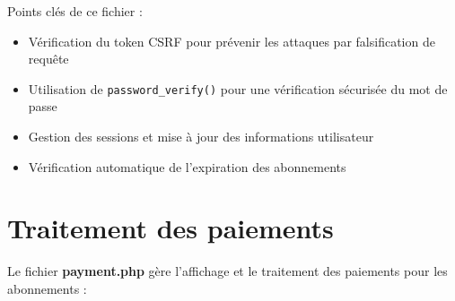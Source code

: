\documentclass[12pt,a4paper]{report}
\begin{document}
Points clés de ce fichier :
\begin{itemize}
    \item Vérification du token CSRF pour prévenir les attaques par falsification de requête
    \item Utilisation de \texttt{password\_verify()} pour une vérification sécurisée du mot de passe
    \item Gestion des sessions et mise à jour des informations utilisateur
    \item Vérification automatique de l'expiration des abonnements
\end{itemize}

\section{Traitement des paiements}
Le fichier \textbf{payment.php} gère l'affichage et le traitement des paiements pour les abonnements :
\end{document}
